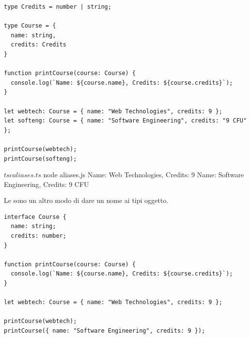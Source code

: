 \begin{affianco}[0.6][c]
\codicepiccolo
\begin{lstlisting}[style=ts, name=aliases.ts]
type Credits = number | string;

type Course = {
  name: string,
  credits: Credits
}

function printCourse(course: Course) {
  console.log(`Name: ${course.name}, Credits: ${course.credits}`);
}

let webtech: Course = { name: "Web Technologies", credits: 9 };
let softeng: Course = { name: "Software Engineering", credits: "9 CFU" };

printCourse(webtech);
printCourse(softeng);
\end{lstlisting}
\risultato
\begin{immagine}
\end{immagine}
\end{affianco}

\begin{console}[Terminale]
$ tsc aliases.ts
$ node aliases.js
Name: Web Technologies, Credits: 9
Name: Software Engineering, Credits: 9 CFU
\end{console}

Le  sono un altro modo di dare un nome ai tipi oggetto.

\begin{lstlisting}[style=ts, name=interfaces.ts]
interface Course {
  name: string;
  credits: number;
}

function printCourse(course: Course) {
  console.log(`Name: ${course.name}, Credits: ${course.credits}`);
}

let webtech: Course = { name: "Web Technologies", credits: 9 };

printCourse(webtech);
printCourse({ name: "Software Engineering", credits: 9 });
\end{lstlisting}

